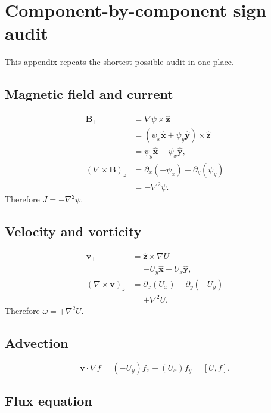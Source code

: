 \documentclass[11pt]{article}
\newcommand{\vect}[1]{\bm{#1}}
\begin{document}
\clearpage
\appendix

\section{Component-by-component sign audit}
\label{app:signaudit}

This appendix repeats the shortest possible audit in one place.

\subsection{Magnetic field and current}

\begin{align}
\vect{B}_\perp
&=\nabla\psi\times\widehat{\vect{z}}\\
&=(\psi_x\widehat{\vect{x}}+\psi_y\widehat{\vect{y}})
\times\widehat{\vect{z}}\\
&=\psi_y\widehat{\vect{x}}-\psi_x\widehat{\vect{y}},\\
(\nabla\times\vect{B})_z
&=\partial_x(-\psi_x)-\partial_y(\psi_y)\\
&=-\nabla^2\psi.
\end{align}
Therefore $J=-\nabla^2\psi$.

\subsection{Velocity and vorticity}

\begin{align}
\vect{v}_\perp
&=\widehat{\vect{z}}\times\nabla U\\
&=-U_y\widehat{\vect{x}}+U_x\widehat{\vect{y}},\\
(\nabla\times\vect{v})_z
&=\partial_x(U_x)-\partial_y(-U_y)\\
&=+\nabla^2U.
\end{align}
Therefore $\omega=+\nabla^2U$.

\subsection{Advection}

\begin{equation}
\vect{v}\cdot\nabla f
=(-U_y)f_x+(U_x)f_y
=[U,f].
\end{equation}

\subsection{Flux equation}
\end{document}
